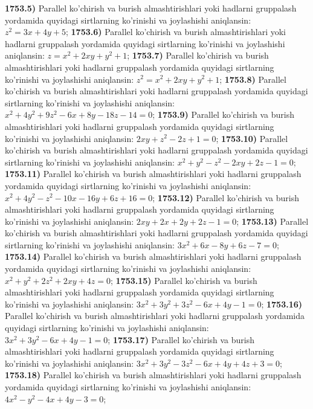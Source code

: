 \textbf{1753.5)} Parallel ko'chirish va burish almashtirishlari yoki hadlarni gruppalash yordamida quyidagi sirtlarning ko'rinishi va joylashishi aniqlansin: $z^2=3 x+4 y+5$;
\textbf{1753.6)} Parallel ko'chirish va burish almashtirishlari yoki hadlarni gruppalash yordamida quyidagi sirtlarning ko'rinishi va joylashishi aniqlansin: $z=x^2+2 x y+y^2+1$;
\textbf{1753.7)} Parallel ko'chirish va burish almashtirishlari yoki hadlarni gruppalash yordamida quyidagi sirtlarning ko'rinishi va joylashishi aniqlansin: $z^2=x^2+2 x y+y^2+1$;
\textbf{1753.8)} Parallel ko'chirish va burish almashtirishlari yoki hadlarni gruppalash yordamida quyidagi sirtlarning ko'rinishi va joylashishi aniqlansin: $x^2+4 y^2+9 z^2-6 x+8 y-18 z-14=0$;
\textbf{1753.9)} Parallel ko'chirish va burish almashtirishlari yoki hadlarni gruppalash yordamida quyidagi sirtlarning ko'rinishi va joylashishi aniqlansin: $2 x y+z^2-2 z+1=0$;
\textbf{1753.10)} Parallel ko'chirish va burish almashtirishlari yoki hadlarni gruppalash yordamida quyidagi sirtlarning ko'rinishi va joylashishi aniqlansin: $x^2+y^2-z^2-2 x y+2 z-1=0$;
\textbf{1753.11)} Parallel ko'chirish va burish almashtirishlari yoki hadlarni gruppalash yordamida quyidagi sirtlarning ko'rinishi va joylashishi aniqlansin: $x^2+4 y^2-z^2-10 x-16 y+6 z+16=0$;
\textbf{1753.12)} Parallel ko'chirish va burish almashtirishlari yoki hadlarni gruppalash yordamida quyidagi sirtlarning ko'rinishi va joylashishi aniqlansin: $2 x y+2 x+2 y+2 z-1=0$;
\textbf{1753.13)} Parallel ko'chirish va burish almashtirishlari yoki hadlarni gruppalash yordamida quyidagi sirtlarning ko'rinishi va joylashishi aniqlansin: $3 x^2+6 x-8 y+6 z-7=0$;
\textbf{1753.14)} Parallel ko'chirish va burish almashtirishlari yoki hadlarni gruppalash yordamida quyidagi sirtlarning ko'rinishi va joylashishi aniqlansin: $x^2+y^2+2 z^2+2 x y+4 z=0$;
\textbf{1753.15)} Parallel ko'chirish va burish almashtirishlari yoki hadlarni gruppalash yordamida quyidagi sirtlarning ko'rinishi va joylashishi aniqlansin: $3 x^2+3 y^2+3 z^2-6 x+4 y-1=0$;
\textbf{1753.16)} Parallel ko'chirish va burish almashtirishlari yoki hadlarni gruppalash yordamida quyidagi sirtlarning ko'rinishi va joylashishi aniqlansin: $3 x^2+3 y^2-6 x+4 y-1=0$;
\textbf{1753.17)} Parallel ko'chirish va burish almashtirishlari yoki hadlarni gruppalash yordamida quyidagi sirtlarning ko'rinishi va joylashishi aniqlansin: $3 x^2+3 y^2-3 z^2-6 x+4 y+4 z+3=0$;
\textbf{1753.18)} Parallel ko'chirish va burish almashtirishlari yoki hadlarni gruppalash yordamida quyidagi sirtlarning ko'rinishi va joylashishi aniqlansin: $4 x^2-y^2-4 x+4 y-3=0$;


